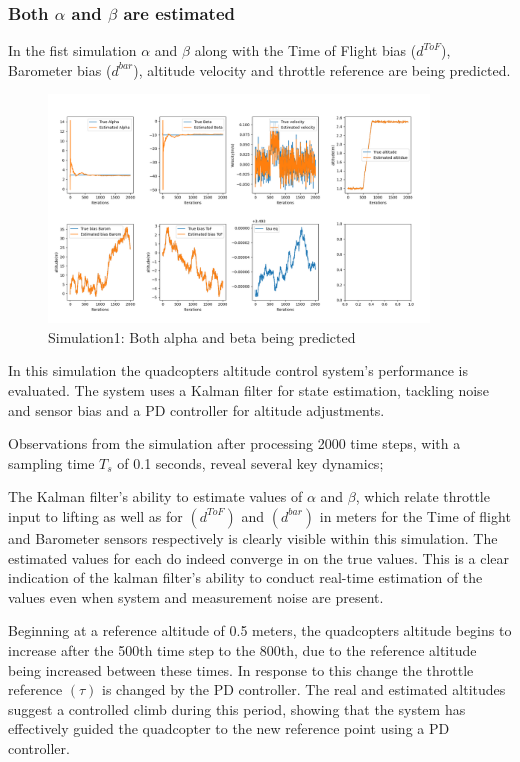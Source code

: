 \documentclass{report}
\begin{document}
\subsubsection*{Both \(\alpha\) and \(\beta\) are estimated}
In the fist simulation \(\alpha\) and \(\beta\) along with the Time of Flight
bias (\(d^{ToF}\)), Barometer bias (\(d^{bar}\)), altitude velocity and throttle
reference are being predicted.
\begin{figure}[H]
  \centering
  \includegraphics[width=0.9\textwidth]{Pictures/no_constant_PD.png}
  \caption{Simulation1: Both alpha and beta being predicted}
  \label{fig:no_constant_PD}
\end{figure}
In this simulation the quadcopters altitude control system's performance is
evaluated. The system uses a Kalman filter for state estimation, tackling noise
and sensor bias and a PD controller for altitude adjustments.

Observations from the simulation after processing 2000 time steps, with a
sampling time \(T_s\) of 0.1 seconds, reveal several key dynamics;

The Kalman filter’s ability to estimate values of \(\alpha\) and \(\beta\),
which relate throttle input to lifting as well as for \((d^{ToF})\) and
\((d^{bar})\) in meters for the Time of flight and Barometer sensors
respectively is clearly visible within this simulation. The estimated values for
each do indeed converge in on the true values. This is a clear indication of the
kalman filter’s ability to conduct real-time estimation of the values even when
system and measurement noise are present.

Beginning at a reference altitude of 0.5 meters, the quadcopters altitude begins
to increase after the 500th time step to the 800th, due to the reference
altitude being increased between these times. In response to this change the
throttle reference \((\tau)\) is changed by the PD controller. The real and
estimated altitudes suggest a controlled climb during this period, showing that
the system has effectively guided the quadcopter to the new reference point
using a PD controller.
\end{document}
